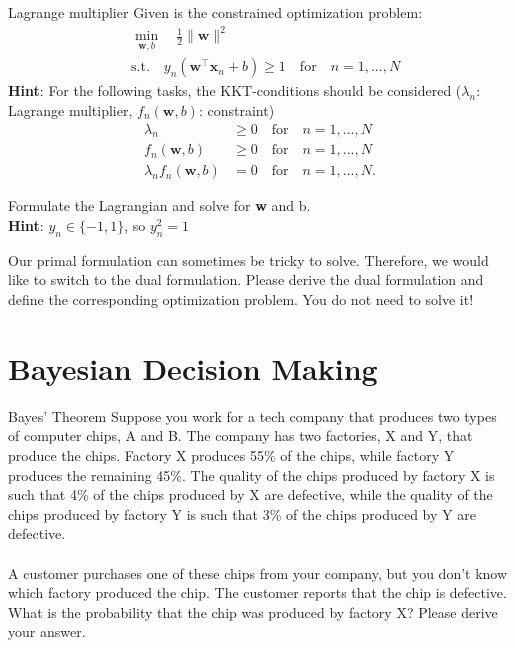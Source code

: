 \documentclass[
	ngerman,
	points=true,%
    solution=true,
    accentcolor=9c,
    colorbacktitle
	]{tudaexercise}
\begin{document}
\begin{task}{Lagrange multiplier}
Given is the constrained optimization problem:
\begin{align*}
    & \min_{\mathbf{w}, b} \quad \frac{1}{2}\| \mathbf{w}\|^{2} \\
    & \text{s.t.} \quad y_{n}(\mathbf{w}^\intercal\mathbf{x}_n+b)\geq 1 \quad \text{for} \quad n=1, ..., N
\end{align*}
\textbf{Hint}: For the following tasks, the KKT-conditions should be considered ($\lambda_n$: Lagrange multiplier, $f_n(\mathbf{w}, b)$: constraint)
\begin{align*}
    \lambda_n & \geq 0 \quad \text{for} \quad n=1, ..., N \\
    f_n(\mathbf{w}, b) & \geq 0 \quad \text{for} \quad n=1, ..., N \\
    \lambda_n f_n(\mathbf{w}, b) & = 0 \quad \text{for} \quad n=1, ..., N.
\end{align*}
\begin{subtask}
Formulate the Lagrangian and solve for \textbf{w} and b. \\
\textbf{Hint}: $y_n \in \{-1, 1\}$, so $y_n^{2}=1$
\end{subtask}
\begin{solution}
    
\end{solution}

\begin{subtask}
Our primal formulation can sometimes be tricky to solve. Therefore, we would like to switch to the dual formulation. Please derive the dual formulation and define the corresponding optimization problem. You do not need to solve it!    
\end{subtask}
\begin{solution}

\end{solution}
\end{task}

\section*{Bayesian Decision Making}
\begin{task}{Bayes' Theorem}
Suppose you work for a tech company that produces two types of computer chips, A and B. The company has two factories, X and Y, that produce the chips. Factory X produces 55\% of the chips, while factory Y produces the remaining 45\%. The quality of the chips produced by factory X is such that 4\% of the chips produced by X are defective, while the quality of the chips produced by factory Y is such that 3\% of the chips produced by Y are defective. \\ \\
A customer purchases one of these chips from your company, but you don't know which factory produced the chip. The customer reports that the chip is defective. What is the probability that the chip was produced by factory X? Please derive your answer. 
\end{task}
\begin{solution}

\end{solution}
\end{document}
